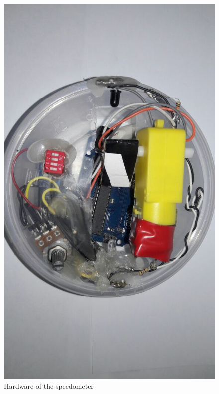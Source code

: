 \begin{figure}[H]
    \centering
    \includegraphics[scale=0.20]{Figures/rot-hardware.jpg}
    \caption{Hardware of the speedometer}
    \end{figure}
    

